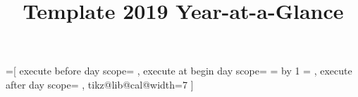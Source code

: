 \documentclass{article}
\begin{document}
  \title{\vspace{-1cm}Template 2019 Year-at-a-Glance\vspace{-1cm}}
  \date{}
  \author{}

  \maketitle
  \thispagestyle{empty} %
  \makeatletter

  =[
      execute before day scope={%
      },
      execute at begin day scope={%
          \pgfmathsetlength\pgf@x{\tikz@lib@cal@xshift}%
          \ifnum{}
          \else
              \c@pgf@counta=\pgfcalendarcurrentweekday
              \advance\c@pgf@counta by 1
          \fi
          \pgf@x=\c@pgf@counta\pgf@x
          \pgftransformxshift{\pgf@x}
      },
      execute after day scope={
      },
      tikz@lib@cal@width=7
  ]

  \makeatother
\end{document}
